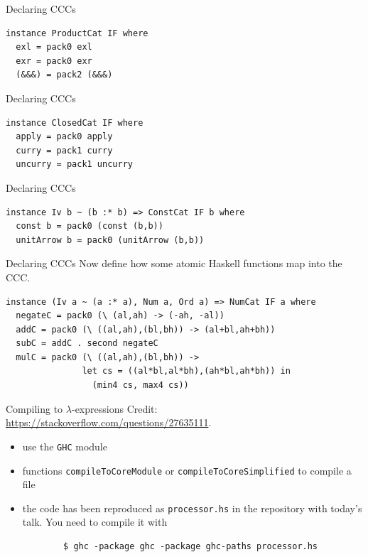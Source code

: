 \documentclass[10pt]{beamer}
\newcommand{\credit}[1]{{\footnotesize #1}}
\theoremstyle{definition}
\theoremstyle{remark}
\numberwithin{equation}{section}
\begin{document}
\begin{frame}[fragile]{Declaring CCCs}
  \begin{lstlisting}[frame=single]
instance ProductCat IF where
  exl = pack0 exl
  exr = pack0 exr
  (&&&) = pack2 (&&&)
  \end{lstlisting}
\end{frame}

\begin{frame}[fragile]{Declaring CCCs}
  \begin{lstlisting}[frame=single]
instance ClosedCat IF where
  apply = pack0 apply
  curry = pack1 curry
  uncurry = pack1 uncurry
  \end{lstlisting}
\end{frame}

\begin{frame}[fragile]{Declaring CCCs}
  \begin{lstlisting}[frame=single]
instance Iv b ~ (b :* b) => ConstCat IF b where
  const b = pack0 (const (b,b))
  unitArrow b = pack0 (unitArrow (b,b))
  \end{lstlisting}
\end{frame}


\begin{frame}[fragile]{Declaring CCCs}
  Now define how some atomic Haskell functions map into the CCC.
  \begin{lstlisting}[frame=single]
instance (Iv a ~ (a :* a), Num a, Ord a) => NumCat IF a where
  negateC = pack0 (\ (al,ah) -> (-ah, -al))
  addC = pack0 (\ ((al,ah),(bl,bh)) -> (al+bl,ah+bh))
  subC = addC . second negateC
  mulC = pack0 (\ ((al,ah),(bl,bh)) ->
               let cs = ((al*bl,al*bh),(ah*bl,ah*bh)) in
                 (min4 cs, max4 cs))
  \end{lstlisting}
\end{frame}

\begin{frame}[fragile]{Compiling to $\lambda$-expressions}
  \credit{Credit: \url{https://stackoverflow.com/questions/27635111}.}
  \begin{itemize}
    \item use the \lstinline{GHC} module
    \item functions \lstinline{compileToCoreModule} or \lstinline{compileToCoreSimplified} to compile a file
    \item the code has been reproduced as \lstinline{processor.hs} in the repository with today's talk. You need to compile it with
      \begin{lstlisting}
        $ ghc -package ghc -package ghc-paths processor.hs
      \end{lstlisting}
  \end{itemize}
\end{frame}
\end{document}

